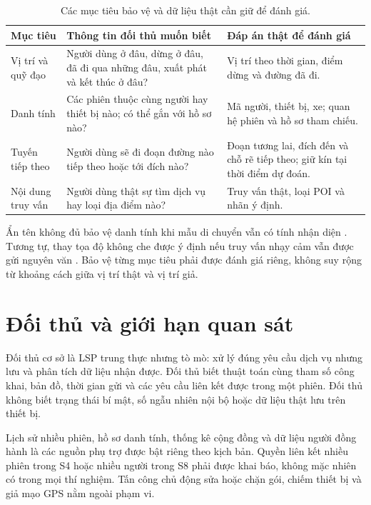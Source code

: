 \documentclass[12pt,a4paper,oneside]{report}
\begin{document}
\begin{table}[htbp]
\centering\small
\caption{Các mục tiêu bảo vệ và dữ liệu thật cần giữ để đánh giá.}
\label{tab:targets}
\begin{tabularx}{\textwidth}{P{2.7cm}Y Y}
\toprule
\textbf{Mục tiêu} & \textbf{Thông tin đối thủ muốn biết} & \textbf{Đáp án thật để đánh giá}\\
\midrule
Vị trí và quỹ đạo & Người dùng ở đâu, dừng ở đâu, đã đi qua những đâu, xuất phát và kết thúc ở đâu?~\citep{shokri2011quantifying,dhondt2022endpoint} & Vị trí theo thời gian, điểm dừng và đường đã đi.\\
\addlinespace
Danh tính & Các phiên thuộc cùng người hay thiết bị nào; có thể gắn với hồ sơ nào?~\citep{beresford2004mixzones,demontjoye2013unique} & Mã người, thiết bị, xe; quan hệ phiên và hồ sơ tham chiếu.\\
\addlinespace
Tuyến tiếp theo & Người dùng sẽ đi đoạn đường nào tiếp theo hoặc tới đích nào?~\citep{ziebart2008maxent} & Đoạn tương lai, đích đến và chỗ rẽ tiếp theo; giữ kín tại thời điểm dự đoán.\\
\addlinespace
Nội dung truy vấn & Người dùng thật sự tìm dịch vụ hay loại địa điểm nào?~\citep{wu2021fakequery} & Truy vấn thật, loại POI và nhãn ý định.\\
\bottomrule
\end{tabularx}
\end{table}

Ẩn tên không đủ bảo vệ danh tính khi mẫu di chuyển vẫn có tính nhận diện \citep{demontjoye2013unique}. Tương tự, thay tọa độ không che được ý định nếu truy vấn nhạy cảm vẫn được gửi nguyên văn \citep{wu2021fakequery}. Bảo vệ từng mục tiêu phải được đánh giá riêng, không suy rộng từ khoảng cách giữa vị trí thật và vị trí giả.

\section{Đối thủ và giới hạn quan sát}

Đối thủ cơ sở là LSP trung thực nhưng tò mò: xử lý đúng yêu cầu dịch vụ nhưng lưu và phân tích dữ liệu nhận được. Đối thủ biết thuật toán cùng tham số công khai, bản đồ, thời gian gửi và các yêu cầu liên kết được trong một phiên. Đối thủ không biết trạng thái bí mật, số ngẫu nhiên nội bộ hoặc dữ liệu thật lưu trên thiết bị.

Lịch sử nhiều phiên, hồ sơ danh tính, thống kê cộng đồng và dữ liệu người đồng hành là các nguồn phụ trợ được bật riêng theo kịch bản. Quyền liên kết nhiều phiên trong S4 hoặc nhiều người trong S8 phải được khai báo, không mặc nhiên có trong mọi thí nghiệm. Tấn công chủ động sửa hoặc chặn gói, chiếm thiết bị và giả mạo GPS nằm ngoài phạm vi.
\end{document}
